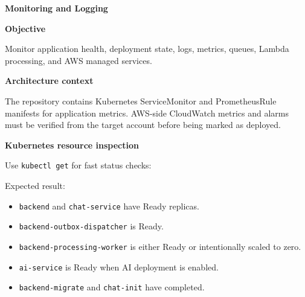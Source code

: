 \vspace{0.5em}\noindent\textbf{Monitoring and Logging}\par

\vspace{0.5em}\noindent\textbf{Objective}\par

Monitor application health, deployment state, logs, metrics, queues,
Lambda processing, and AWS managed services.

\vspace{0.5em}\noindent\textbf{Architecture context}\par

The repository contains Kubernetes ServiceMonitor and PrometheusRule
manifests for application metrics. AWS-side CloudWatch metrics and
alarms must be verified from the target account before being marked as
deployed.

\vspace{0.5em}\noindent\textbf{Kubernetes resource
inspection}\par

Use \texttt{kubectl\ get} for fast status checks:

\begin{Shaded}
\begin{Highlighting}[]
\OperatorTok{=}
\end{Highlighting}
\end{Shaded}

Expected result:

\begin{itemize}
\tightlist
\item
  \texttt{backend} and \texttt{chat-\allowbreak{}service} have Ready replicas.
\item
  \texttt{backend-\allowbreak{}outbox-\allowbreak{}dispatcher} is Ready.
\item
  \texttt{backend-\allowbreak{}processing-\allowbreak{}worker} is either Ready or intentionally
  scaled to zero.
\item
  \texttt{ai-\allowbreak{}service} is Ready when AI deployment is enabled.
\item
  \texttt{backend-\allowbreak{}migrate} and \texttt{chat-\allowbreak{}init} have completed.
\end{itemize}

